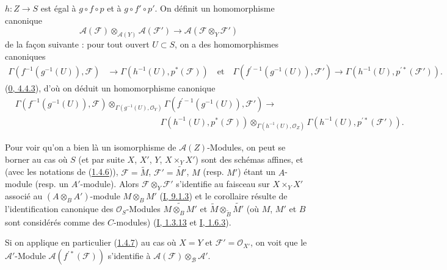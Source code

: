 $h:Z\to S$ est égal à $g\circ f\circ p$ et à $g\circ f'\circ p'$. On
définit un homomorphisme canonique
\[
  \mathcal{A}(\mathcal{F})\otimes_{\mathcal{A}(Y)}\mathcal{A}(\mathcal{F}')
  \longrightarrow \mathcal{A}(\mathcal{F}\otimes_Y\mathcal{F}')
\]
de la façon suivante : pour tout ouvert $U\subset S$, on a des homomorphismes
canoniques
\[
  \begin{aligned}
  \Gamma(f^{-1}(g^{-1}(U)),\mathcal{F})
  &\longrightarrow \Gamma(h^{-1}(U),p^*(\mathcal{F}))\quad\text{et}\quad
  \Gamma(f^{\prime-1}(g^{-1}(U)),\mathcal{F}')
  \longrightarrow \Gamma(h^{-1}(U),p^{\prime*}(\mathcal{F}')).
  \end{aligned}
\]
(\hyperref[0.4.4.3-fr]{0, 4.4.3}), d'où on déduit un homomorphisme canonique
\[
  \begin{aligned}
  &\Gamma(f^{-1}(g^{-1}(U)),\mathcal{F})
    \otimes_{\Gamma(g^{-1}(U),\mathcal{O}_Y)}
    \Gamma(f^{\prime-1}(g^{-1}(U)),\mathcal{F}')\longrightarrow\\
  &\hspace{17em}
    \Gamma(h^{-1}(U),p^*(\mathcal{F}))
    \otimes_{\Gamma(h^{-1}(U),\mathcal{O}_Z)}
    \Gamma(h^{-1}(U),p^{\prime*}(\mathcal{F}')).
  \end{aligned}
\]

Pour voir qu'on a bien là un isomorphisme de $\mathcal{A}(Z)$-Modules, on
peut se borner au cas où $S$ (et par suite $X$, $X'$, $Y$,
$X\times_Y X'$) sont des schémas affines, et (avec les notations de
(\hyperref[II.1.4.6-fr]{1.4.6})), $\mathcal{F}=\widetilde{M}$,
$\mathcal{F}'=\widetilde{M'}$, $M$ (resp. $M'$) étant un $A$-module (resp. un
$A'$-module). Alors $\mathcal{F}\otimes_Y\mathcal{F}'$ s'identifie au
faisceau sur $X\times_Y X'$ associé au $(A\otimes_B A')$-module
$M\otimes_B M'$ (\hyperref[I.9.1.3-fr]{I, 9.1.3}) et le corollaire résulte de
l'identification canonique des $\mathcal{O}_S$-Modules
$\widetilde{M\otimes_B M'}$ et
$\widetilde{M}\otimes_{\widetilde{B}}\widetilde{M'}$ (où $M$, $M'$ et $B$
sont considérés comme des $C$-modules)
(\hyperref[I.1.3.13-fr]{I, 1.3.13} et
\hyperref[I.1.6.3-fr]{I, 1.6.3}).

Si on applique en particulier (\hyperref[II.1.4.7-fr]{1.4.7}) au cas où
$X=Y$ et $\mathcal{F}'=\mathcal{O}_{X'}$, on voit que le
$\mathcal{A}'$-Module $\mathcal{A}(f^{\prime*}(\mathcal{F}))$ s'identifie à
$\mathcal{A}(\mathcal{F})\otimes_{\mathcal{B}}\mathcal{A}'$.

